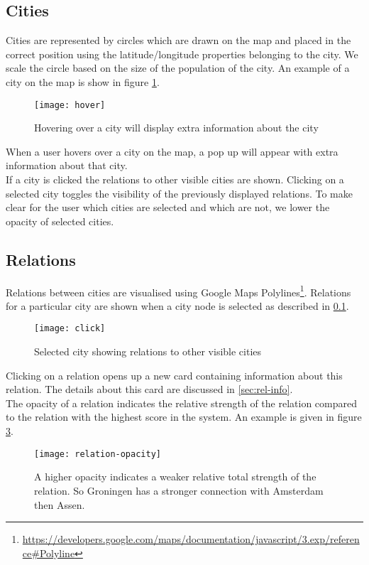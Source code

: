 \subsection{Cities}\label{sec:city}
Cities are represented by circles which are drawn on the map and placed in the correct position using the latitude/longitude properties belonging to the city. We scale the circle based on the size of the population of the city. An example of a city on the map is show in figure \ref{fig:map-city}.

\begin{figure}[H]
  \centering
  \texttt{[image: hover]}
  \caption{Hovering over a city will display extra information about the city}
  \label{fig:map-city}
\end{figure}

When a user hovers over a city on the map, a pop up will appear with extra information about that city.\\
If a city is clicked the relations to other visible cities are shown. Clicking on a selected city toggles the visibility of the previously displayed relations. To make clear for the user  which cities are selected and which are not, we lower the opacity of selected cities.

\subsection{Relations}

Relations between cities are visualised using Google Maps Polylines\footnote{\url{https://developers.google.com/maps/documentation/javascript/3.exp/reference\#Polyline}}. Relations for a particular city are shown when a city node is selected as described in \ref{sec:city}.\\
\begin{figure}[H]
  \centering
  \texttt{[image: click]}
  \caption{Selected city showing relations to other visible cities}
  \label{fig:sub2}
\end{figure}

Clicking on a relation opens up a new card containing information about this relation. The details about this card are discussed in \ref{sec:rel-info}.\\
The opacity of a relation indicates the relative strength of the relation compared to the relation with the highest score in the system. An example is given in figure \ref{fig:relation-opacity}.

\begin{figure}[H]
  \centering
  \texttt{[image: relation-opacity]}
  \caption{A higher opacity indicates a weaker relative total strength of the relation. So Groningen has a stronger connection with Amsterdam then Assen.}
  \label{fig:relation-opacity}
\end{figure}


